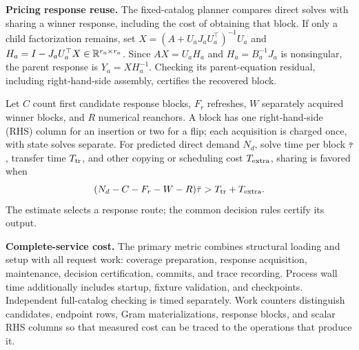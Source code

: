 \textbf{Pricing response reuse.} The fixed-catalog planner compares direct solves with sharing a winner response, including the cost of obtaining that block. If only a child factorization remains, set $X=(A+U_aJ_aU_a^\top)^{-1}U_a$ and $H_a=I-J_aU_a^\top X\in\mathbb R^{r_a\times r_a}$. Since $AX=U_aH_a$ and $H_a=B_a^{-1}J_a$ is nonsingular, the parent response is $Y_a=XH_a^{-1}$. Checking its parent-equation residual, including right-hand-side assembly, certifies the recovered block.

Let $C$ count first candidate response blocks, $F_r$ refreshes, $W$ separately acquired winner blocks, and $R$ numerical reanchors. A block has one right-hand-side (RHS) column for an insertion or two for a flip; each acquisition is charged once, with state solves separate. For predicted direct demand $N_d$, solve time per block $\bar\tau$, transfer time $T_{\rm tr}$, and other copying or scheduling cost $T_{\rm extra}$, sharing is favored when
\begin{equation}
 (N_d-C-F_r-W-R)\bar\tau>T_{\rm tr}+T_{\rm extra}.
 \label{eq:planner}
\end{equation}
The estimate selects a response route; the common decision rules certify its output.

\textbf{Complete-service cost.} The primary metric combines structural loading and setup with all request work: coverage preparation, response acquisition, maintenance, decision certification, commits, and trace recording. Process wall time additionally includes startup, fixture validation, and checkpoints. Independent full-catalog checking is timed separately. Work counters distinguish candidates, endpoint rows, Gram materializations, response blocks, and scalar RHS columns so that measured cost can be traced to the operations that produce it.
